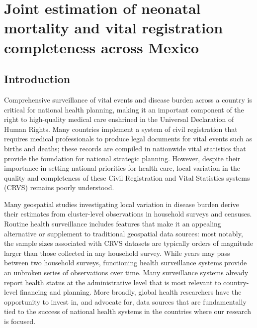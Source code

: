 \documentclass[
]{report}
\begin{document}
\printbibliography[segment=\therefsegment,heading=none]

\hypertarget{joint-estimation-of-neonatal-mortality-and-vital-registration-completeness-across-mexico}{%
\chapter{Joint estimation of neonatal mortality and vital registration completeness across Mexico}\label{joint-estimation-of-neonatal-mortality-and-vital-registration-completeness-across-mexico}}

\hypertarget{introduction-1}{%
\section{Introduction}\label{introduction-1}}

Comprehensive surveillance of vital events and disease burden across a country is critical for national health planning, making it an important component of the right to high-quality medical care enshrined in the Universal Declaration of Human Rights.\autocite{Setel2007,srs} Many countries implement a system of civil registration that requires medical professionals to produce legal documents for vital events such as births and deaths; these records are compiled in nationwide vital statistics that provide the foundation for national strategic planning.\autocite{Abouzahr2005} However, despite their importance in setting national priorities for health care, local variation in the quality and completeness of these Civil Registration and Vital Statistics systems (CRVS) remains poorly understood.

Many geospatial studies investigating local variation in disease burden derive their estimates from cluster-level observations in household surveys and censuses.\autocite{Diggle2016,Wakefield2020} Routine health surveillance includes features that make it an appealing alternative or supplement to traditional geospatial data sources: most notably, the sample sizes associated with CRVS datasets are typically orders of magnitude larger than those collected in any household survey. While years may pass between two household surveys, functioning health surveillance systems provide an unbroken series of observations over time. Many surveillance systems already report health status at the administrative level that is most relevant to country-level financing and planning. More broadly, global health researchers have the opportunity to invest in, and advocate for, data sources that are fundamentally tied to the success of national health systems in the countries where our research is focused.\autocite{AbouZahr2015}
\end{document}
